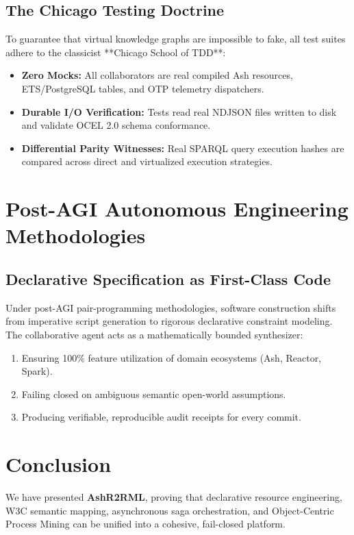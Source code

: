 \documentclass[12pt,a4paper,oneside]{book}
\begin{document}
\section{The Chicago Testing Doctrine}
To guarantee that virtual knowledge graphs are impossible to fake, all test suites adhere to the classicist **Chicago School of TDD**:
\begin{itemize}
    \item \textbf{Zero Mocks:} All collaborators are real compiled Ash resources, ETS/PostgreSQL tables, and OTP telemetry dispatchers.
    \item \textbf{Durable I/O Verification:} Tests read real NDJSON files written to disk and validate OCEL 2.0 schema conformance.
    \item \textbf{Differential Parity Witnesses:} Real SPARQL query execution hashes are compared across direct and virtualized execution strategies.
\end{itemize}

\chapter{Post-AGI Autonomous Engineering Methodologies}

\section{Declarative Specification as First-Class Code}
Under post-AGI pair-programming methodologies, software construction shifts from imperative script generation to rigorous declarative constraint modeling. The collaborative agent acts as a mathematically bounded synthesizer:
\begin{enumerate}
    \item Ensuring 100\% feature utilization of domain ecosystems (Ash, Reactor, Spark).
    \item Failing closed on ambiguous semantic open-world assumptions.
    \item Producing verifiable, reproducible audit receipts for every commit.
\end{enumerate}

\chapter{Conclusion}
We have presented \textbf{AshR2RML}, proving that declarative resource engineering, W3C semantic mapping, asynchronous saga orchestration, and Object-Centric Process Mining can be unified into a cohesive, fail-closed platform.
\end{document}
